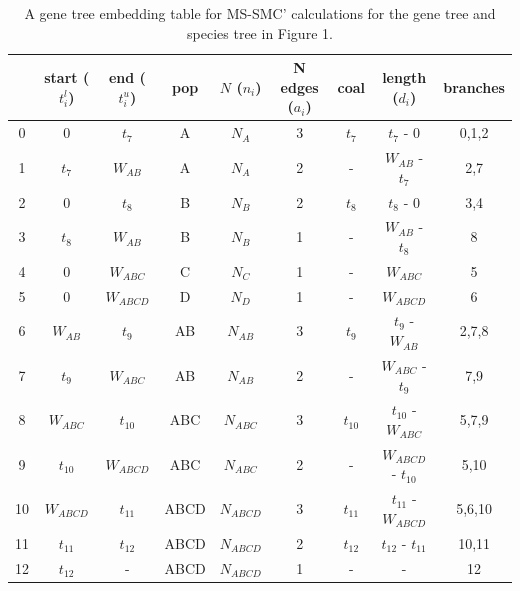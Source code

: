 \documentclass[11pt]{article}
\begin{document}
\begin{table}[h]
\centering
\caption{\label{tab:table-1} 
	A gene tree embedding table for MS-SMC' calculations for the gene tree and
 	species tree in Figure 1. 
}
\begin{tabular}[t]{ |c|c|c|c|c|c|c|c|c| }
	\toprule
	 & start ($t_i^l$)  & end ($t_i^u$) & pop & $N$ ($n_i$)  & N edges ($a_i$) & coal  & length ($d_i$) & branches \\
	\midrule
	0 & 0          & $t_7$      & A   & $N_A$     & 3 & $t_7$    & $t_7$ - 0            & 0,1,2 \\
	1 & $t_7$      & $W_{AB}$   & A   & $N_A$     & 2 & -        & $W_{AB}$ - $t_7$     & 2,7   \\	
	2 & 0          & $t_8$      & B   & $N_B$     & 2 & $t_8$    & $t_8$ - 0            & 3,4   \\ 
	3 & $t_8$      & $W_{AB}$   & B   & $N_B$     & 1 & -        & $W_{AB}$ - $t_8$     & 8     \\
	4 & 0          & $W_{ABC}$  & C   & $N_C$     & 1 & -        & $W_{ABC}$            & 5     \\
	5 & 0          & $W_{ABCD}$ & D   & $N_D$     & 1 & -        & $W_{ABCD}$           & 6     \\
	6 & $W_{AB}$   & $t_9$      & AB  & $N_{AB}$  & 3 & $t_9$    & $t_9$ - $W_{AB}$     & 2,7,8 \\
	7 & $t_9$      & $W_{ABC}$  & AB  & $N_{AB}$  & 2 & -        & $W_{ABC}$ - $t_9$    & 7,9   \\
	8 & $W_{ABC}$  & $t_{10}$   & ABC & $N_{ABC}$ & 3 & $t_{10}$ & $t_{10}$ - $W_{ABC}$ & 5,7,9  \\
	9 & $t_{10}$   & $W_{ABCD}$ & ABC & $N_{ABC}$ & 2 & -        & $W_{ABCD}$ - $t_{10}$ & 5,10 \\
	10 & $W_{ABCD}$ & $t_{11}$  & ABCD & $N_{ABCD}$ & 3 & $t_{11}$ & $t_{11}$ - $W_{ABCD}$ & 5,6,10 \\
	11 & $t_{11}$  & $t_{12}$   & ABCD & $N_{ABCD}$ & 2 & $t_{12}$ & $t_{12}$ - $t_{11}$ & 10,11 \\
	12 & $t_{12}$  & -          & ABCD & $N_{ABCD}$ & 1 & -        & -                   & 12    \\	
	\bottomrule
\end{tabular}
\end{table}
\end{document}
